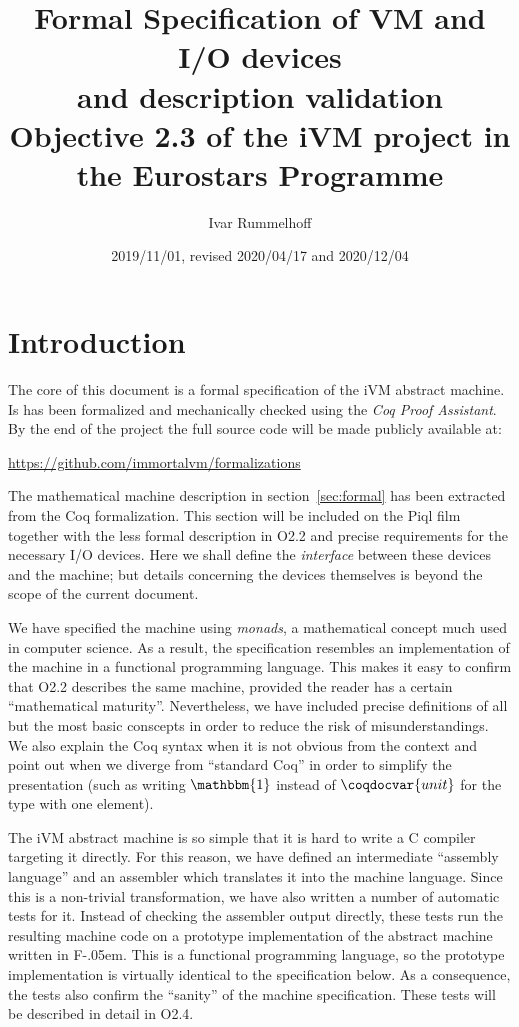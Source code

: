 \documentclass[10pt,a4paper]{article}
\title{%
  Formal Specification of VM and I/O devices\\
  and description validation\\[2ex]
  \large \textbf{Objective 2.3} of the iVM project in the Eurostars Programme
}
\author{Ivar Rummelhoff}
\date{2019/11/01, revised 2020/04/17 and 2020/12/04}
\newcommand{\FSharp}{\textsf{F\nolinebreak[4]\kern-.05em\raisebox{.2ex}{\small\#}}\xspace}
\begin{document}
\maketitle

\section{Introduction}

The core of this document is a formal specification of the iVM abstract machine. Is has been formalized and mechanically checked using the \emph{Coq Proof Assistant}. By the end of the project the full source code will be made publicly available at:

\begin{center}
  \url{https://github.com/immortalvm/formalizations}
\end{center}

The mathematical machine description in section~\ref{sec:formal} has been extracted from the Coq formalization. This section will be included on the Piql film together with the less formal description in O2.2 and precise requirements for the necessary I/O devices. Here we shall define the \emph{interface} between these devices and the machine; but details concerning the devices themselves is beyond the scope of the current document.

We have specified the machine using \emph{monads}, a mathematical concept much used in computer science. As a result, the specification resembles an implementation of the machine in a functional programming language. This makes it easy to confirm that O2.2 describes the same machine, provided the reader has a certain ``mathematical maturity''. Nevertheless, we have included precise definitions of all but the most basic conscepts in order to reduce the risk of misunderstandings. We also explain the Coq syntax when it is not obvious from the context and point out when we diverge from ``standard Coq'' in order to simplify the presentation (such as writing $\mathbbm{1}$ instead of $\coqdocvar{unit}$ for the type with one element).

The iVM abstract machine is so simple that it is hard to write a C compiler targeting it directly. For this reason, we have defined an intermediate ``assembly language'' and an assembler which translates it into the machine language. Since this is a non-trivial transformation, we have also written a number of automatic tests for it. Instead of checking the assembler output directly, these tests run the resulting machine code on a prototype implementation of the abstract machine written in \FSharp. This is a functional programming language, so the prototype implementation is virtually identical to the specification below. As a consequence, the tests also confirm the ``sanity'' of the machine specification. These tests will be described in detail in O2.4.
\end{document}
